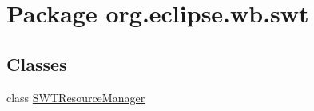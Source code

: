 \hypertarget{namespaceorg_1_1eclipse_1_1wb_1_1swt}{\section{Package org.\-eclipse.\-wb.\-swt}
\label{namespaceorg_1_1eclipse_1_1wb_1_1swt}
}
\subsection*{Classes}
\begin{DoxyCompactItemize}
\item 
class \hyperlink{classorg_1_1eclipse_1_1wb_1_1swt_1_1_s_w_t_resource_manager}{S\-W\-T\-Resource\-Manager}
\end{DoxyCompactItemize}
